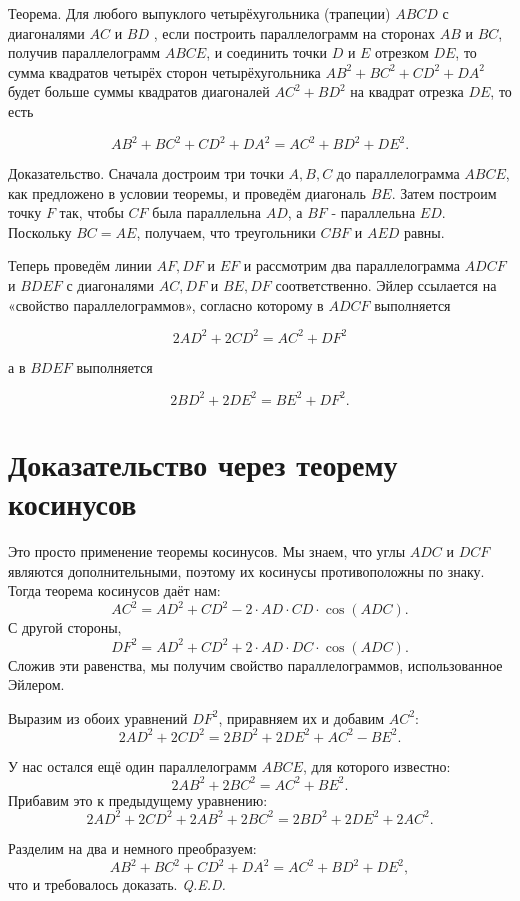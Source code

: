 Теорема. Для любого выпуклого четырёхугольника (трапеции) $A B C D$ с диагоналями $A C$ и $B D$ , если построить параллелограмм на сторонах $A B$ и $B C$, получив параллелограмм $A B C E$, и соединить точки $D$ и $E$ отрезком $D E$, то сумма квадратов четырёх сторон четырёхугольника $A B^2+B C^2+C D^2+D A^2$ будет больше суммы квадратов диагоналей $A C^2+B D^2$ на квадрат отрезка $D E$, то есть

$$
A B^2+B C^2+C D^2+D A^2=A C^2+B D^2+D E^2 .
$$


Доказательство. Сначала достроим три точки $A, B, C$ до параллелограмма $A B C E$, как предложено в условии теоремы, и проведём диагональ $B E$. Затем построим точку $F$ так, чтобы $C F$ была параллельна $A D$, а $B F$ - параллельна $E D$. Поскольку $B C=A E$, получаем, что треугольники $C B F$ и $A E D$ равны.

Теперь проведём линии $A F, D F$ и $E F$ и рассмотрим два параллелограмма $A D C F$ и $B D E F$ с диагоналями $A C, D F$ и $B E, D F$ соответственно. Эйлер ссылается на «свойство параллелограммов», согласно которому в $A D C F$ выполняется

$$
2 A D^2+2 C D^2=A C^2+D F^2
$$


а в $B D E F$ выполняется

$$
2 B D^2+2 D E^2=B E^2+D F^2 .
$$

\section*{Доказательство через теорему косинусов}

Это просто применение теоремы косинусов. Мы знаем, что углы \( ADC \) и \( DCF \) являются дополнительными, поэтому их косинусы противоположны по знаку. Тогда теорема косинусов даёт нам:
\[ AC^2 = AD^2 + CD^2 - 2 \cdot AD \cdot CD \cdot \cos(ADC). \]
С другой стороны,
\[ DF^2 = AD^2 + CD^2 + 2 \cdot AD \cdot DC \cdot \cos(ADC). \]
Сложив эти равенства, мы получим свойство параллелограммов, использованное Эйлером.

Выразим из обоих уравнений \( DF^2 \), приравняем их и добавим \( AC^2 \):
\[ 2AD^2 + 2CD^2 = 2BD^2 + 2DE^2 + AC^2 - BE^2. \]

У нас остался ещё один параллелограмм \( ABCE \), для которого известно:
\[ 2AB^2 + 2BC^2 = AC^2 + BE^2. \]
Прибавим это к предыдущему уравнению:
\[ 2AD^2 + 2CD^2 + 2AB^2 + 2BC^2 = 2BD^2 + 2DE^2 + 2AC^2. \]

Разделим на два и немного преобразуем:
\[ AB^2 + BC^2 + CD^2 + DA^2 = AC^2 + BD^2 + DE^2, \]
что и требовалось доказать. \quad \textit{Q.E.D.}

